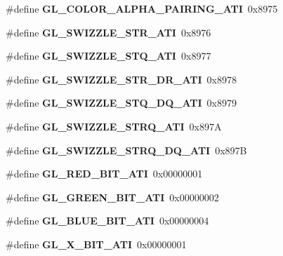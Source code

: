 \begin{DoxyCompactItemize}
\item 
\#define {\bfseries G\+L\+\_\+\+C\+O\+L\+O\+R\+\_\+\+A\+L\+P\+H\+A\+\_\+\+P\+A\+I\+R\+I\+N\+G\+\_\+\+A\+T\+I}~0x8975\label{_s_d_l__opengl_8h_a0f555ef0089abcb38f6602b5741b3a91}

\item 
\#define {\bfseries G\+L\+\_\+\+S\+W\+I\+Z\+Z\+L\+E\+\_\+\+S\+T\+R\+\_\+\+A\+T\+I}~0x8976\label{_s_d_l__opengl_8h_a31f559b0657573e0e776fd5884aad300}

\item 
\#define {\bfseries G\+L\+\_\+\+S\+W\+I\+Z\+Z\+L\+E\+\_\+\+S\+T\+Q\+\_\+\+A\+T\+I}~0x8977\label{_s_d_l__opengl_8h_a2c28ffe251eae1e411b9ab069758b965}

\item 
\#define {\bfseries G\+L\+\_\+\+S\+W\+I\+Z\+Z\+L\+E\+\_\+\+S\+T\+R\+\_\+\+D\+R\+\_\+\+A\+T\+I}~0x8978\label{_s_d_l__opengl_8h_a22cf8ec81426cd1d9589a7be018182c5}

\item 
\#define {\bfseries G\+L\+\_\+\+S\+W\+I\+Z\+Z\+L\+E\+\_\+\+S\+T\+Q\+\_\+\+D\+Q\+\_\+\+A\+T\+I}~0x8979\label{_s_d_l__opengl_8h_a3011095062d59fd9025631d73aa34d50}

\item 
\#define {\bfseries G\+L\+\_\+\+S\+W\+I\+Z\+Z\+L\+E\+\_\+\+S\+T\+R\+Q\+\_\+\+A\+T\+I}~0x897\+A\label{_s_d_l__opengl_8h_acba5bb81f3cd87ce706d2119f43121a7}

\item 
\#define {\bfseries G\+L\+\_\+\+S\+W\+I\+Z\+Z\+L\+E\+\_\+\+S\+T\+R\+Q\+\_\+\+D\+Q\+\_\+\+A\+T\+I}~0x897\+B\label{_s_d_l__opengl_8h_a93c55cec6eb01b32e4e31f0955042cce}

\item 
\#define {\bfseries G\+L\+\_\+\+R\+E\+D\+\_\+\+B\+I\+T\+\_\+\+A\+T\+I}~0x00000001\label{_s_d_l__opengl_8h_a1bb772e513934dcce901bc8c87b21e8c}

\item 
\#define {\bfseries G\+L\+\_\+\+G\+R\+E\+E\+N\+\_\+\+B\+I\+T\+\_\+\+A\+T\+I}~0x00000002\label{_s_d_l__opengl_8h_a310590938bea2b709ecb424be4cd78a9}

\item 
\#define {\bfseries G\+L\+\_\+\+B\+L\+U\+E\+\_\+\+B\+I\+T\+\_\+\+A\+T\+I}~0x00000004\label{_s_d_l__opengl_8h_ac1466f113ced7af99ada97c910175a07}

\item 
\#define {\bfseries G\+L\+\_\+X\+\_\+\+B\+I\+T\+\_\+\+A\+T\+I}~0x00000001\label{_s_d_l__opengl_8h_a377aec5d6de6a0065d9d1e0737fe3d30}


\end{DoxyCompactItemize}
